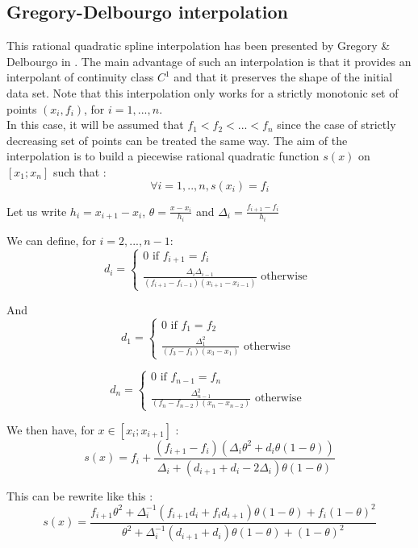 \documentclass[a4paper,11pt,english]{book}
\begin{document}
\subsection{Gregory-Delbourgo interpolation}
This rational quadratic spline interpolation has been presented by Gregory \& Delbourgo in \cite{gregory1982piecewise}. The main advantage of such an interpolation is that it provides an interpolant of continuity class $C^1$ and that it preserves the shape of the initial data set. Note that this interpolation only works for a strictly monotonic set of points $(x_i,f_i)$, for $i=1,...,n$. \\

In this case, it will be assumed that $f_1 < f_2 < ...< f_n$ since the case of strictly decreasing set of points can be treated the same way. The aim of the interpolation is to build a piecewise rational quadratic function $s(x)$ on $[x_1;x_n]$ such that :
$$\forall i=1,..,n, s(x_i)=f_i$$

Let us write $h_i=x_{i+1}-x_i$, $\theta=\frac{x-x_i}{h_i}$ and $\Delta_i=\frac{f_{i+1}-f_i}{h_i}$

We can define, for $i=2,...,n-1$: $$d_i = \left\{
    \begin{array}{ll}
        0 \text{ if } f_{i+1}=f_i \\
        \frac{\Delta_i\Delta_{i-1}}{(f_{i+1}-f_{i-1})(x_{i+1}-x_{i-1})} \text{ otherwise }
    \end{array}
\right.$$

And 
$$d_1 = \left\{
    \begin{array}{ll}
        0 \text{ if } f_{1}=f_2 \\
        \frac{\Delta_1^2}{(f_{3}-f_{1})(x_{3}-x_{1})} \text{ otherwise }
    \end{array}
\right.$$

$$d_n = \left\{
    \begin{array}{ll}
        0 \text{ if } f_{n-1}=f_n \\
        \frac{\Delta_{n-1}^2}{(f_{n}-f_{n-2})(x_{n}-x_{n-2})} \text{ otherwise }
    \end{array}
\right.$$

We then have, for $x\in [x_i;x_{i+1}]$ : $$s(x) = f_i + \frac{(f_{i+1}-f_{i})(\Delta_i\theta^2+d_i\theta(1-\theta))}{\Delta_i+(d_{i+1}+d_i-2\Delta_i)\theta(1-\theta)}$$

This can be rewrite like this :
$$s(x)=\frac{f_{i+1}\theta^2 + \Delta_i^{-1}(f_{i+1}d_i+f_id_{i+1})\theta(1-\theta)+f_i(1-\theta)^2}{\theta^2+\Delta_i^{-1}(d_{i+1}+d_i)\theta(1-\theta)+(1-\theta)^2}$$
\end{document}
